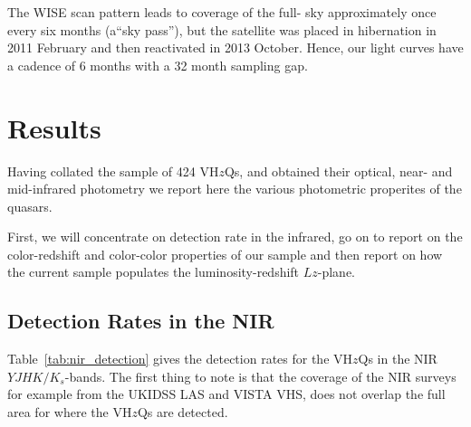 \documentclass[usenatbib]{mnras}
\begin{document}
The WISE scan pattern leads to coverage of the full- sky approximately
once every six months (a``sky pass''), but the satellite was placed in
hibernation in 2011 February and then reactivated in 2013
October. Hence, our light curves have a cadence of 6 months with a 32
month sampling gap.



\section{Results}
Having collated the sample of 424 VH$z$Qs, and obtained their optical,
near- and mid-infrared photometry we report here the various
photometric properites of the quasars.

First, we will concentrate on detection rate in the infrared, go on to
report on the color-redshift and color-color properties of our sample
and then report on how the current sample populates the
luminosity-redshift $Lz$-plane.


    \subsection{Detection Rates in the NIR}
    Table~\ref{tab:nir_detection} gives the detection rates for the 
    VH$z$Qs in the NIR $YJHK/K_{s}$-bands. 
    The first thing to note is that the coverage of the NIR surveys 
    for example from the UKIDSS LAS and VISTA VHS, does
    not overlap the full area for where the VH$z$Qs are detected. 
\end{document}
